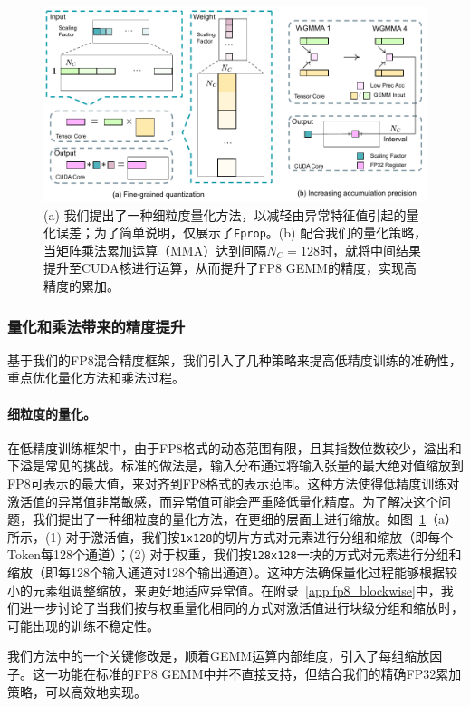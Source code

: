 \documentclass[lang=cn,a4paper,newtx]{elegantpaper}
\begin{document}
\begin{figure}[!t]
\centering
\includegraphics[width=0.95\linewidth]{figures/fp8-128accumulatorv4.pdf}
\caption{
    (a) 我们提出了一种细粒度量化方法，以减轻由异常特征值引起的量化误差；为了简单说明，仅展示了\texttt{Fprop}。(b) 配合我们的量化策略，当矩阵乘法累加运算（MMA）达到间隔$N_C=128$时，就将中间结果提升至CUDA核进行运算，从而提升了FP8 GEMM的精度，实现高精度的累加。
}
\label{fig:fp8_quantization}
\end{figure}

\subsubsection{量化和乘法带来的精度提升}

基于我们的FP8混合精度框架，我们引入了几种策略来提高低精度训练的准确性，重点优化量化方法和乘法过程。

\paragraph{细粒度的量化。}
在低精度训练框架中，由于FP8格式的动态范围有限，且其指数位数较少，溢出和下溢是常见的挑战。标准的做法是，输入分布通过将输入张量的最大绝对值缩放到FP8可表示的最大值，来对齐到FP8格式的表示范围。这种方法使得低精度训练对激活值的异常值非常敏感，而异常值可能会严重降低量化精度。为了解决这个问题，我们提出了一种细粒度的量化方法，在更细的层面上进行缩放。如图~\ref{fig:fp8_quantization}（a）所示，(1) 对于激活值，我们按\texttt{1x128}的切片方式对元素进行分组和缩放（即每个Token每128个通道）；(2) 对于权重，我们按\texttt{128x128}一块的方式对元素进行分组和缩放（即每128个输入通道对128个输出通道）。这种方法确保量化过程能够根据较小的元素组调整缩放，来更好地适应异常值。在附录~\ref{app:fp8_blockwise}中，我们进一步讨论了当我们按与权重量化相同的方式对激活值进行块级分组和缩放时，可能出现的训练不稳定性。

我们方法中的一个关键修改是，顺着GEMM运算内部维度，引入了每组缩放因子。这一功能在标准的FP8 GEMM中并不直接支持，但结合我们的精确FP32累加策略，可以高效地实现。
\end{document}
